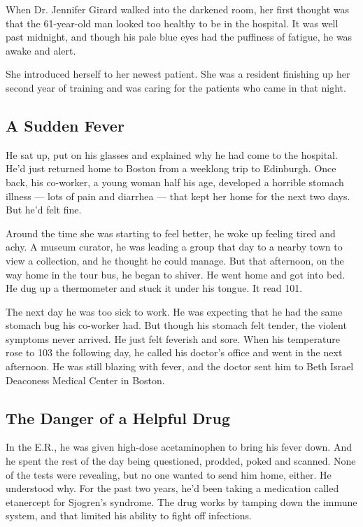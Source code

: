 When Dr. Jennifer Girard walked into the darkened room, her first
thought was that the 61-year-old man looked too healthy to be in the
hospital. It was well past midnight, and though his pale blue eyes had
the puffiness of fatigue, he was awake and alert.

She introduced herself to her newest patient. She was a resident
finishing up her second year of training and was caring for the patients
who came in that night.

\hypertarget{a-sudden-fever}{%
\subsection{\texorpdfstring{\textbf{A Sudden
Fever}}{A Sudden Fever}}\label{a-sudden-fever}}

He sat up, put on his glasses and explained why he had come to the
hospital. He'd just returned home to Boston from a weeklong trip to
Edinburgh. Once back, his co-worker, a young woman half his age,
developed a horrible stomach illness --- lots of pain and diarrhea ---
that kept her home for the next two days. But he'd felt fine.

Around the time she was starting to feel better, he woke up feeling
tired and achy. A museum curator, he was leading a group that day to a
nearby town to view a collection, and he thought he could manage. But
that afternoon, on the way home in the tour bus, he began to shiver. He
went home and got into bed. He dug up a thermometer and stuck it under
his tongue. It read 101.

The next day he was too sick to work. He was expecting that he had the
same stomach bug his co-worker had. But though his stomach felt tender,
the violent symptoms never arrived. He just felt feverish and sore. When
his temperature rose to 103 the following day, he called his doctor's
office and went in the next afternoon. He was still blazing with fever,
and the doctor sent him to Beth Israel Deaconess Medical Center in
Boston.

\hypertarget{the-danger-of-a-helpful-drug}{%
\subsection{\texorpdfstring{\textbf{The Danger of a Helpful
Drug}}{The Danger of a Helpful Drug}}\label{the-danger-of-a-helpful-drug}}

In the E.R., he was given high-dose acetaminophen to bring his fever
down. And he spent the rest of the day being questioned, prodded, poked
and scanned. None of the tests were revealing, but no one wanted to send
him home, either. He understood why. For the past two years, he'd been
taking a medication called etanercept for Sjogren's syndrome. The drug
works by tamping down the immune system, and that limited his ability to
fight off infections.

